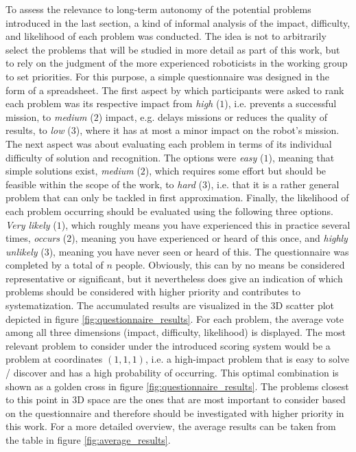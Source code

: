 \documentclass[english, master, utf8]{base/thesis_KBS}
\begin{document}
To assess the relevance to long-term autonomy of the potential problems introduced in the last section, a kind of informal analysis of the impact, 
difficulty, and likelihood of each problem was conducted. The idea is not to arbitrarily select the problems that will be studied in more detail as part
of this work, but to rely on the judgment of the more experienced roboticists in the working group to set priorities.
For this purpose, a simple questionnaire was designed in the form of a spreadsheet. The first aspect by which participants were asked to rank each problem was its 
respective impact from \textit{high} ($1$), i.e. prevents a successful mission, to \textit{medium} ($2$) impact, e.g. delays missions or reduces the quality of 
results, to \textit{low} ($3$), where it has at most a minor impact on the robot's mission. The next aspect was about evaluating each problem in terms of its individual
difficulty of solution and recognition. The options were \textit{easy} ($1$), meaning that simple solutions exist, \textit{medium} ($2$), which requires some effort but
should be feasible within the scope of the work, to \textit{hard} ($3$), i.e. that it is a rather general problem that can only be tackled in first approximation.
Finally, the likelihood of each problem occurring should be evaluated using the following three options. \textit{Very likely} ($1$), which roughly means you have experienced
this in practice several times, \textit{occurs} ($2$), meaning you have experienced or heard of this once, and \textit{highly unlikely} ($3$), meaning you have never 
seen or heard of this. The questionnaire was completed by a total of $n$ people. Obviously, this can by no means be considered representative or significant, but it 
nevertheless does give an indication of which problems should be considered with higher priority and contributes to systematization. The accumulated results are visualized in the
3D scatter plot depicted in figure \ref{fig:questionnaire_results}. For each problem, the average vote among all three dimensions (impact, difficulty, likelihood) is displayed.
The most relevant problem to consider under the introduced scoring system would be a problem at coordinates $(1, 1, 1)$, i.e. a high-impact problem 
that is easy to solve / discover and has a high probability of occurring. This optimal combination is shown as a golden cross in figure \ref{fig:questionnaire_results}.
The problems closest to this point in 3D space are the ones that are most important to consider based on the questionnaire and therefore should be 
investigated with higher priority in this work. For a more detailed overview, the average results can be taken from the table in figure \ref{fig:average_results}.
\end{document}
